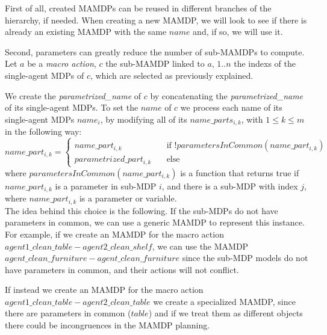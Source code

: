 First of all, created MAMDPs can be reused in different branches of the hierarchy, if needed. When creating a new MAMDP, we will look to see if there is already an existing MAMDP with the same $name$ and, if so, we will use it.

Second, parameters can greatly  reduce the number of sub-MAMDPs to compute. Let $a$ be a \textit{macro action}, $c$ the sub-MAMDP linked to $a$, $1..n$ the indexs of the single-agent MDPs of $c$, which are selected as previously explained.

 We create the \textit{parametrized\_name} of $c$ by concatenating the \textit{parametrized\_name} of its single-agent MDPs. To set the $name$ of  $c$ we process each name of its single-agent MDPs $name_i$, by modifying all of its $name\_parts_{i,k}$, with $1 \leq k \leq m$ in the following way:\\
$name\_part_{i,k}=
\begin{cases}
	name\_part_{i,k} & \quad \text{if } !parametersInCommon(name\_part_{i,k}) \\
	parametrized\_part_{i,k} & \quad \text{else}
\end{cases}$ \\
where $parametersInCommon(name\_part_{i,k})$ is a function that returns true if $name\_part_{i,k}$ is a parameter in sub-MDP $i$, and there is a sub-MDP with index $j$, where $name\_part_{i,k}$ is a parameter or variable. \\

The idea behind this choice is the following. If the sub-MDPs do not have parameters in common, we can use a generic MAMDP to represent this instance. For example, if we create an MAMDP for the macro action $agent1\_clean\_table-agent2\_clean\_shelf$, we can use the MAMDP $agent\_clean\_furniture-agent\_clean\_furniture$ since the sub-MDP models do not have parameters in common, and their actions will not conflict.

 If instead we create an MAMDP for the macro action $agent1\_clean\_table-agent2\_clean\_table$ we create a specialized MAMDP, since there are parameters in common ($table$) and if we treat them as different objects there could be incongruences in the MAMDP planning.





 
